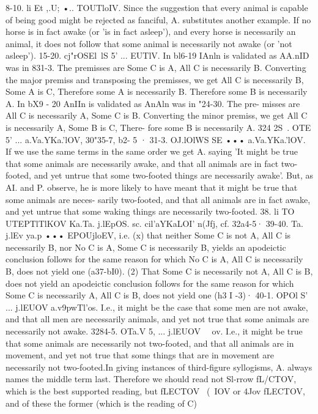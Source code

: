 {{{8-10. li Et ,.U; •.. TOUTloIV. Since the suggestion that every
animal is capable of being good might be rejected as fanciful, A.
substitutes another example. If no horse is in fact awake (or
'is in fact asleep'), and every horse is necessarily an animal, it
does not follow that some animal is necessarily not awake (or
'not asleep').
15-20. cj"rOSEl~lS 5' ... EUTlV. In bl6-19 IAnln is validated as
AA.nID was in 831-3. The premisses are Some C is A, All C is
necessarily B. Converting the major premiss and transposing the
premisses, we get All C is necessarily B, Some A is C, Therefore
some A is necessarily B. Therefore some B is necessarily A.
In bX9 - 20 AnIIn is validated as AnAln was in "24-30. The pre-
misses are All C is necessarily A, Some C is B. Converting the
minor premiss, we get All C is necessarily A, Some B is C, There-
fore some B is necessarily A.
324
2S~. OTE
5' ... a.Va.YKa.'lOV, 30"35-7, b2- 5 ·
31-3. OJ.lOlWS SE ••• a.Va.YKa.'lOV. If we use the same terms in
the same order we get A. saying 'It might be true that some
animals are necessarily awake, and that all animals are in fact
two-footed, and yet untrue that some two-footed things are
necessarily awake'. But, as AI. and P. observe, he is more likely
to have meant that it might be true that some animals are neces-
sarily two-footed, and that all animals are in fact awake, and yet
untrue that some waking things are necessarily two-footed.
38. li TO UTEPTlTlKOV Ka.Ta. j.lEpOS. sc. cil'aYKaLOI' n(Jfj, cf. 32a4-5·
39-40. Ta. j.lEv ya.p ••• EPOUjloEV, i.e. (x) that neither Some C is
not A, All C is necessarily B, nor No C is A, Some C is necessarily
B, yields an apodeictic conclusion follows for the same reason
for which No C is A, All C is necessarily B, does not yield one
(a37-bI0). (2) That Some C is necessarily not A, All C is B, does
not yield an apodeictic conclusion follows for the same reason for
which Some C is necessarily A, All C is B, does not yield one
(h3 I -3)·
40-1. OPOl S' ... j.lEUOV a.v9pwTl'os. I.e., it might be the case
that some men are not awake, and that all men are necessarily
animals, and yet not true that some animals are necessarily not
awake.
3284-5. OTa.V 5, ... j.lEUOV ~~ov. I.e., it might be true that
some animals are necessarily not two-footed, and that all
animals are in movement, and yet not true that some things that
are in movement are necessarily not two-footed.In giving instances of third-figure syllogisms, A. always names
the middle term last. Therefore we should read not Sl-rrow
fL/CTOV, which is the best supported reading, but fLECTOV ~(~IOV or
{4Jov fLECTOV, and of these the former (which is the reading of C)
}}}}

